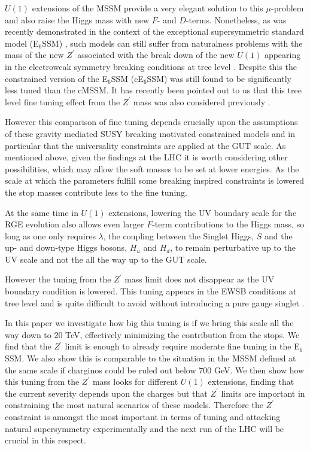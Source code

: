 \documentclass[preprint,amsmath,amssymb,aps,superscriptaddress,prd,
showpacs,floatfix,nofootinbib]{revtex4-1}
\begin{document}
$U(1)$ extensions of the MSSM provide a very elegant solution to this
$\mu$-problem \cite{Fayet:1977yc, Kim:1983dt, Suematsu:1994qm,
  Cvetic:1995rj, Cvetic:1996mf, Jain:1995cb, Nir:1995bu,
  Cvetic:1997ky} and also raise the Higgs mass with new $F$- and
$D$-terms.  Nonetheless, as was recently demonstrated in the context
of the exceptional supersymmetric standard model (E$_6$SSM)
\cite{King:2005jy, King:2005my, Athron:2010zz}, such models can still
suffer from naturalness problems with the mass of the new $Z^\prime$
associated with the break down of the new $U(1)$ appearing in the
electroweak symmetry breaking conditions at tree level
\cite{Athron:2013ipa}.  Despite this the constrained version of the
E$_6$SSM (cE$_6$SSM) \cite{Athron:2009ue, Athron:2009bs} was still
found to be significantly less tuned than the cMSSM.  It has recently
been pointed out to us that this tree level fine tuning effect from
the $Z^\prime$ mass was also considered previously \cite{Drees:1985js}.

However this comparison of fine tuning depends crucially upon the
assumptions of these gravity mediated SUSY breaking motivated
constrained models and in particular that the universality
constraints are applied at the GUT scale.  As mentioned above, given
the findings at the LHC it is worth considering other possibilities,
which may allow the soft masses to be set at lower energies.  As the
scale at which the parameters fulfill some breaking inspired
constraints is lowered the stop masses contribute less to the fine
tuning.

At the same time in $U(1)$ extensions, lowering the UV boundary scale
for the RGE evolution also allows even larger $F$-term contributions
to the Higgs mass, so long as one only requires $\lambda$, the
coupling between the Singlet Higgs, $S$ and the up- and down-type
Higgs bosons, $H_u$ and $H_d$, to remain perturbative up to the UV
scale and not the all the way up to the GUT scale.

However the tuning from the $Z^\prime$ mass limit does not disappear
as the UV boundary condition is lowered.  This tuning appears in the
EWSB conditions at tree level and is quite difficult to avoid without
introducing a pure gauge singlet \cite{Athron:2014pua}.

In this paper we investigate how big this tuning is if we bring this
scale all the way down to 20 TeV, effectively minimizing the contribution
from the stops.  We find that the $Z^\prime$ limit is enough to already
require moderate fine tuning in the E$_6$SSM.  We also show this is
comparable to the situation in the MSSM defined at the same scale if
charginos could be ruled out below $700$ GeV.  We then show how this
tuning from the $Z^\prime$ mass looks for different $U(1)$ extensions,
finding that the current severity depends upon the charges but that
$Z^\prime$ limits are important in constraining the most natural
scenarios of these models.  Therefore the $Z^\prime$ constraint
is amongst the most important in terms of tuning and attacking natural
supersymmetry experimentally and the next run of the LHC will be
crucial in this respect.
\end{document}
